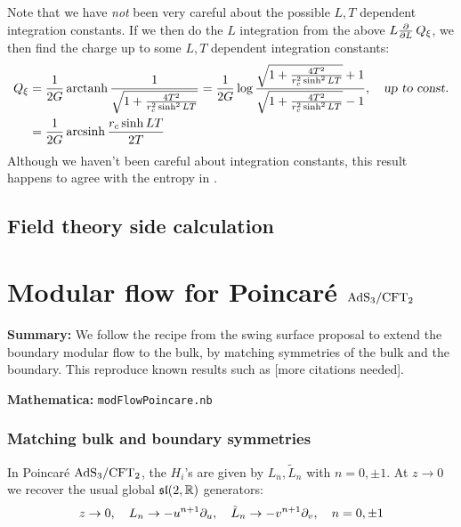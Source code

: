 \documentclass[11pt,a4paper]{article}
\begin{document}
	Note that we have \textit{not} been very careful about the possible $L,T$ dependent integration constants. If we then do the $L$ integration from the above $L \pdv{L}\,Q_\xi$, we then find the charge up to some $L,T$ dependent integration constants:
	\begin{equation}
	\begin{aligned}
		Q_\xi
		&= \frac{1}{2G} \operatorname{arctanh}
			\frac{1}{\sqrt{
				1 + \frac{4T^2}{r_c^2 \sinh^2 LT}
			}}
		= \frac{1}{2G} \log
			\frac{
				\sqrt{
					1 + \frac{4T^2}{r_c^2 \sinh^2 LT}
				} + 1
			}{
				\sqrt{
					1 + \frac{4T^2}{r_c^2 \sinh^2 LT}
				} - 1
			},
	\quad\textsl{up to const.} \\
		&= \frac{1}{2G} \operatorname{arcsinh}
			\frac{r_c \sinh LT}{2T}
	\end{aligned}
	\end{equation}
	Although we haven't been careful about integration constants, this result happens to agree with the entropy in \cite{Lewkowycz:2019xse}. 
	
\subsection{Field theory side calculation}
	
	
\appendix

\section{Modular flow for Poincar\'e $\mathrm{AdS}_3/\mathrm{CFT}_2$}

\textbf{Summary:} We follow the recipe from the swing surface proposal \cite{Apolo:2020bld,Apolo:2020qjm} to extend the boundary modular flow to the bulk, by matching symmetries of the bulk and the boundary. This reproduce known results such as \cite{Lashkari:2016idm,Czech:2019vih,Apolo:2020qjm} [more citations needed].

\noindent\textbf{Mathematica:} \texttt{modFlowPoincare.nb}

\subsubsection{Matching bulk and boundary symmetries}
	In Poincar\'e $\mathrm{AdS}_3/\mathrm{CFT}_2$, the $H_i$'s are given by $L_n,\tilde{L}_n$ with $n=0,\pm 1$. At $z\to 0$ we recover the usual global $\mathfrak{sl}(2,\mathbb{R})$ generators:
	\begin{equation}
		z\to 0,
	\quad
		      L_n \to -u^{n+1} \partial_{u},\quad
		\tilde{L}_n \to -v^{n+1} \partial_{v},\quad
	n = 0,\pm 1
	\end{equation}
	
\end{document}
